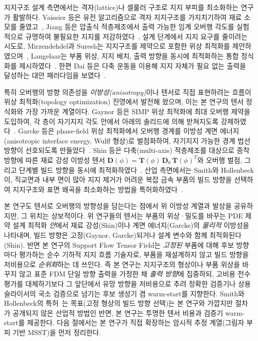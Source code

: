 \documentclass[11pt,a4paper]{article}
\begin{document}
지지구조 설계 측면에서는 격자(lattice)나 셀룰러 구조로 지지 부피를 최소화하는 연구가 활발하다.
Vaissier 등은 유전 알고리즘으로 격자 지지구조를 가지치기하여 재료 소모를 줄였고~\cite{vaissier2019},
Jiang 등은 압출식 적층제조에서 출력 가능한 임계 오버행 각도를 실험적으로 규명하여
불필요한 지지를 저감하였다~\cite{jiang2018}.
설계 단계에서 지지 요구를 줄이려는 시도로, Mirzendehdel과 Suresh는 지지구조를 제약으로 포함한
위상 최적화를 제안하였으며~\cite{mirzendehdel2016}, Langelaar는 부품 위상, 지지 배치, 출력 방향을
동시에 최적화하는 통합 정식화를 제시하였다~\cite{langelaar2018}.
한편 Dai 등은 다축 운동을 이용해 지지 자체가 필요 없는 출력을 달성하는 대안 패러다임을 보였다~\cite{dai2018}.

특히 오버행의 방향 의존성을 \emph{이방성(anisotropy)}이나 텐서로 직접 표현하려는 흐름이
위상 최적화(topology optimization) 진영에서 발전해 왔으며, 이는 본 연구의 텐서 정식화와 가장 가까운 계열이다.
Gaynor 등은 SIMP 위상 최적화에 최대 오버행 제약을 도입하여, 각 층이 자기지지 각도 안에서
아래의 솔리드에 의해 받쳐지도록 강제하였다~\cite{gaynor2014}.
Garcke 등은 phase-field 위상 최적화에서 오버행 경계를 이방성 계면 에너지
(anisotropic interface energy, Wulff 형상)로 벌점화하여, 자기지지 가능한 경계 법선 방향이
선호되도록 만들었다~\cite{garcke2023}.
Shin 등은 다축(multi-axis) 적층제조를 대상으로 증착 방향에 따른 재료 강성 이방성 텐서
$\mathbf{D}(\phi)=\mathbf{T}(\phi)\,\mathbf{D}_0\,\mathbf{T}(\phi)^T$와 오버행 벌점,
그리고 단계별 빌드 방향을 동시에 최적화하였다~\cite{shin2025}.
산업 측면에서는 Smith와 Hollenbeck이, 직교면과 내부 면이 많아 지지 제거가 어려운
복잡 금속 부품의 빌드 방향을 선택하여 지지구조와 표면 왜곡을 최소화하는 방법을 특허화하였다~\cite{smith2025patent}.

본 연구도 텐서로 오버행의 방향성을 담는다는 점에서 위 이방성 계열과 발상을 공유하지만,
그 위치는 상보적이다.
위 연구들의 텐서는 부품의 위상·밀도를 바꾸는 PDE 제약 설계 최적화 \emph{안}에서
재료 강성(Shin)이나 계면 에너지(Garcke)의 \emph{물리적} 이방성을 나타내며,
빌드 방향은 고정(Gaynor, Garcke)되거나 설계 변수와 함께 최적화된다(Shin).
반면 본 연구의 Support Flow Tensor Field는 \emph{고정된} 부품에 대해 후보 방향마다 평가하는
순수 기하적 지지 흐름 기술자로, 부품을 재설계하지 않고 빌드 방향을 저비용으로 \emph{순위화}하는 데 쓰인다.
즉 본 연구는 지지구조의 형상이나 부품 위상을 바꾸지 않고 표준 FDM 단일 방향 출력을 가정한 채
\emph{출력 방향}에 집중하되, 고비용 전수 평가를 대체하기보다 그 앞단에서 유망 방향을 저비용으로
추려 정확한 검증기나 상용 슬라이서의 국소 검증으로 넘기는 후보 생성기 겸 warm-start를 지향한다.
Smith와 Hollenbeck의 특허~\cite{smith2025patent}는 목표(고정 형상의 빌드 방향 선택)는 본 연구와 가깝지만
절차가 공개되지 않은 산업적 방법인 반면, 본 연구는 투명한 텐서 비용과 검증기 warm-start를 제공한다.
다음 절에서는 본 연구가 직접 확장하는 암시적 추정 계열(그림자 부피 기반 MSST)을 먼저 정리한다.
\end{document}
